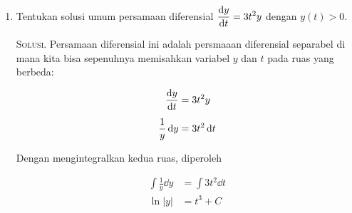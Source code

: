 \documentclass{exam}
\renewenvironment{proof}[1][Solusi.]{\ProofBox\strut\textsc{#1}\space}{\endProofBox}
\numberwithin{equation}{section}
\begin{document}
\begin{enumerate}
\begin{proof}
        \begin{align*}
            V   &= \int_{0}^{3} \dd{V}                                  \\[.5em]
                &= \int_{0}^{3} 2 \pi x \dd{x}                          \\[.5em]
                &= \cancel{2}\pi \frac{x^2}{\cancel{2}} \Big|_{0}^{3}   \\[.5em]
                &= \pi{x^2} \Big|_{0}^{3}                               \\[.5em]
                &= \pi(3^2 - 0^2)                                       \\[.5em]
                &= 9\pi
        \end{align*}


%
%
    
    \end{proof}\vspace{1em}
    
    \item Tentukan solusi umum persamaan diferensial $\displaystyle \dv{y}{t} = 3t^2y$ dengan $y(t) > 0$.
    \begin{proof}
        Persamaan diferensial ini adalah persmaaan diferensial separabel di mana kita bisa sepenuhnya memisahkan variabel $y$ dan $t$ pada ruas yang berbeda:

        \vspace{-1.5em}
        \begin{align*}
            \dv{y}{t}           &= 3t^2y        \\[.5em]
            \frac{1}{y}\dd{y}   &= 3t^2 \dd{t}
        \end{align*}
        
        Dengan mengintegralkan kedua ruas, diperoleh

        \vspace{-1.5em}
        \begin{align*}
            \int \frac{1}{y} \dd{y} &= \int 3t^2 \dd{t} \\[.5em]
            \ln|y|                  &= t^3 + C
        \end{align*}


\end{proof}
\end{enumerate}
\end{document}
